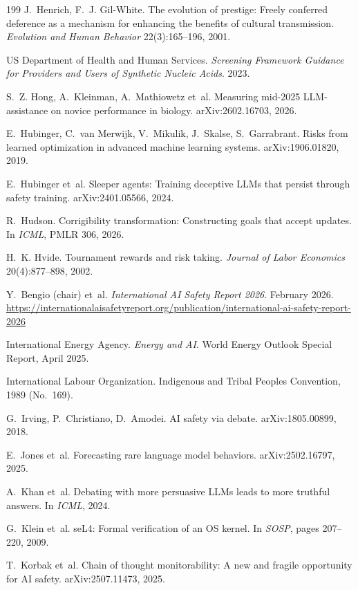\documentclass[10pt,twocolumn,letterpaper]{article}
\theoremstyle{definition}
\begin{document}
\begin{thebibliography}{199}
 J.~Henrich, F.~J. Gil-White. The evolution of prestige: Freely conferred deference as a mechanism for enhancing the benefits of cultural transmission. \emph{Evolution and Human Behavior} 22(3):165--196, 2001.

 US Department of Health and Human Services. \emph{Screening Framework Guidance for Providers and Users of Synthetic Nucleic Acids}. 2023.

 S.~Z. Hong, A.~Kleinman, A.~Mathiowetz et~al. Measuring mid-2025 LLM-assistance on novice performance in biology. arXiv:2602.16703, 2026.

 E.~Hubinger, C.~van Merwijk, V.~Mikulik, J.~Skalse, S.~Garrabrant. Risks from learned optimization in advanced machine learning systems. arXiv:1906.01820, 2019.

 E.~Hubinger et~al. Sleeper agents: Training deceptive LLMs that persist through safety training. arXiv:2401.05566, 2024.

 R.~Hudson. Corrigibility transformation: Constructing goals that accept updates. In \emph{ICML}, PMLR 306, 2026.

 H.~K. Hvide. Tournament rewards and risk taking. \emph{Journal of Labor Economics} 20(4):877--898, 2002.

 Y.~Bengio (chair) et~al. \emph{International AI Safety Report 2026}. February 2026. \url{https://internationalaisafetyreport.org/publication/international-ai-safety-report-2026}

 International Energy Agency. \emph{Energy and AI}. World Energy Outlook Special Report, April 2025.

 International Labour Organization. Indigenous and Tribal Peoples Convention, 1989 (No.~169).

 G.~Irving, P.~Christiano, D.~Amodei. AI safety via debate. arXiv:1805.00899, 2018.

 E.~Jones et~al. Forecasting rare language model behaviors. arXiv:2502.16797, 2025.

 A.~Khan et~al. Debating with more persuasive LLMs leads to more truthful answers. In \emph{ICML}, 2024.

 G.~Klein et~al. seL4: Formal verification of an OS kernel. In \emph{SOSP}, pages 207--220, 2009.

 T.~Korbak et~al. Chain of thought monitorability: A new and fragile opportunity for AI safety. arXiv:2507.11473, 2025.


\end{thebibliography}
\end{document}
